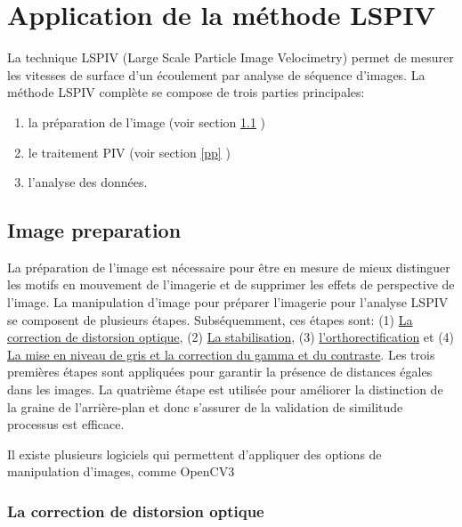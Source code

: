 \documentclass[
]{article}
\begin{document}
\hypertarget{application-de-la-muxe9thode-lspiv}{%
\section{Application de la méthode LSPIV}\label{application-de-la-muxe9thode-lspiv}}

La technique LSPIV (Large Scale Particle Image Velocimetry) permet de
mesurer les vitesses de surface d'un écoulement par analyse de séquence
d'images. La méthode LSPIV complète se compose de trois parties
principales:

\begin{enumerate}
\def\labelenumi{\arabic{enumi}.}
\item
  la préparation de l'image (voir section \ref{ip} )
\item
  le traitement PIV (voir section \ref{pp} )
\item
  l'analyse des données.
\end{enumerate}

\hypertarget{ip}{%
\subsection{Image preparation}\label{ip}}

La préparation de l'image est nécessaire pour être en mesure de mieux distinguer les motifs en mouvement de l'imagerie et de supprimer les effets de perspective de l'image. La manipulation d'image pour préparer l'imagerie pour l'analyse LSPIV se composent de plusieurs étapes. Subséquemment, ces étapes sont:
(1) \protect\hyperlink{la-correction-de-distorsion-optique}{La correction de distorsion optique}, (2) \protect\hyperlink{la-stabilisation}{La stabilisation}, (3) \protect\hyperlink{lorthorectification-dimage}{l'orthorectification} et
(4) \protect\hyperlink{la-mise-en-niveau-de-gris-et-la-correction-du-gamma-et-du-contraste}{La mise en niveau de gris et la correction du gamma et du contraste}. Les trois premières étapes
sont appliquées pour garantir la présence de distances égales dans les images.
La quatrième étape est utilisée pour améliorer la distinction de la graine de
l'arrière-plan et donc s'assurer de la validation de similitude
processus est efficace.

Il existe plusieurs logiciels qui permettent d'appliquer des options de manipulation d'images, comme OpenCV3\citep{noauthor_opencv_2015}

\hypertarget{la-correction-de-distorsion-optique}{%
\subsubsection*{La correction de distorsion optique}\label{la-correction-de-distorsion-optique}}
\end{document}
